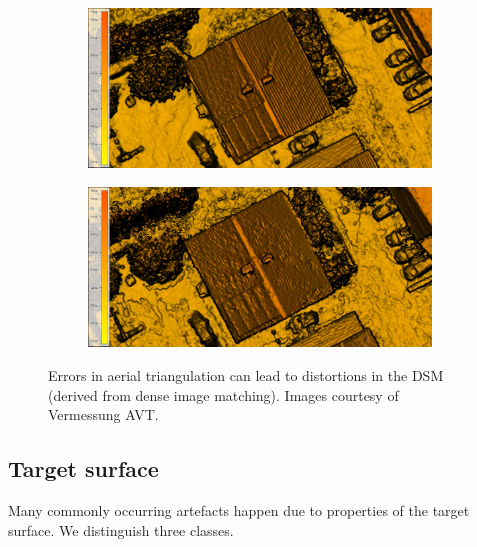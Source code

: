 \begin{figure}
	\begin{subfigure}{0.95\linewidth}
		\includegraphics[width=\textwidth]{figs/Roof_DSM_NA_10cm.jpg}
		\label{fig:dim:b}
	\end{subfigure}
	\begin{subfigure}{0.95\linewidth}
		\includegraphics[width=\textwidth]{figs/Roof_DSM_NA+OBL_10cm.jpg}
		\label{fig:dim:c}
	\end{subfigure}
	\caption{Errors in aerial triangulation can lead to distortions in the DSM (derived from dense image matching). Images courtesy of Vermessung AVT.}%
\label{fig:dim}
\end{figure}


\subsection{Target surface}
Many commonly occurring  artefacts  happen due to properties of the target surface. We distinguish three classes.

